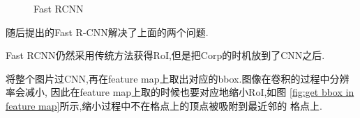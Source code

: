 \begin{figure}[htbp]
    \centering
    \caption{Fast RCNN}
\end{figure}

随后提出的Fast R-CNN解决了上面的两个问题.

Fast RCNN仍然采用传统方法获得RoI,但是把Corp的时机放到了CNN之后.

将整个图片过CNN,再在feature map上取出对应的bbox.图像在卷积的过程中分辨率会减小,
因此在feature map上取的时候也要对应地缩小RoI,如图
\ref{fig:get bbox in feature map}所示,缩小过程中不在格点上的顶点被吸附到最近邻的
格点上.

